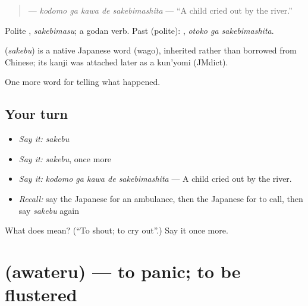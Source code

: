 \begin{quote}
\textbf{  } — \emph{kodomo ga kawa de sakebimashita} — \textquotedblleft{}A child cried out by the river.\textquotedblright{}
\end{quote}

Polite \textbf{}, \emph{sakebimasu}; a godan verb. Past (polite): \textbf{ }, \emph{otoko ga sakebimashita}.

\begin{cousinweb}
\textbf{} (\emph{sakebu}) is a native Japanese word (wago), inherited rather than borrowed from Chinese; its kanji was attached later as a kun'yomi (JMdict).
\end{cousinweb}

\begin{grammarlens}[title={What you've built}]
One more word for telling what happened.
\end{grammarlens}

\subsection*{Your turn}
\begin{itemize}
\raggedright
  \item \emph{Say it:} \emph{sakebu}
  \item \emph{Say it:} \emph{sakebu}, once more
  \item \emph{Say it:} \emph{kodomo ga kawa de sakebimashita} — A child cried out by the river.
  \item \emph{Recall:} say the Japanese for an ambulance, then the Japanese for to call, then say \emph{sakebu} again
\end{itemize}

\begin{tcolorbox}[breakable,colback=teal!4,colframe=teal!35!black,title={Before you move on}]
What does  mean? (\textquotedblleft{}To shout; to cry out\textquotedblright{}.) Say it once more.
\end{tcolorbox}
\section[\texorpdfstring{\ja{あわてる} (awateru)}{あわてる (awateru)}]{ (awateru) — to panic; to be flustered}

\label{lesson:JA-C263-awateru}




